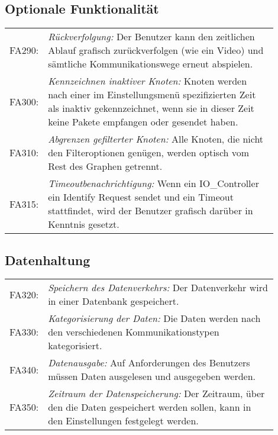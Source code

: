 \subsection{Optionale Funktionalität}
\begin{tabular}{lp{0.9\linewidth}}

FA290: & \textit{Rückverfolgung: }Der Benutzer kann den zeitlichen Ablauf grafisch zurückverfolgen (wie ein Video) und sämtliche Kommunikationswege erneut abspielen. \\

FA300: & \textit{Kennzeichnen inaktiver Knoten: }Knoten werden nach einer im Einstellungsmenü spezifizierten Zeit als inaktiv gekennzeichnet, wenn sie in dieser Zeit keine Pakete empfangen oder gesendet haben. \\

FA310: & \textit{Abgrenzen gefilterter Knoten: }Alle Knoten, die nicht den Filteroptionen genügen, werden optisch vom Rest des Graphen getrennt. \\

FA315: & \textit{Timeoutbenachrichtigung: }Wenn ein IO\_Controller ein Identify Request sendet und ein Timeout stattfindet, wird der Benutzer grafisch darüber in Kenntnis gesetzt. \\

\end{tabular}

\subsection{Datenhaltung}

\begin{tabular}{lp{0.9\linewidth}}

FA320: & \textit{Speichern des Datenverkehrs: }Der Datenverkehr wird in einer Datenbank gespeichert. \\

FA330: & \textit{Kategorisierung der Daten: }Die Daten werden nach den verschiedenen Kommunikationstypen kategorisiert. \\

FA340: & \textit{Datenausgabe: }Auf Anforderungen des Benutzers müssen Daten ausgelesen und ausgegeben werden. \\

FA350: & \textit{Zeitraum der Datenspeicherung: }Der Zeitraum, über den die Daten gespeichert werden sollen, kann in den Einstellungen festgelegt werden. \\

\end{tabular}

